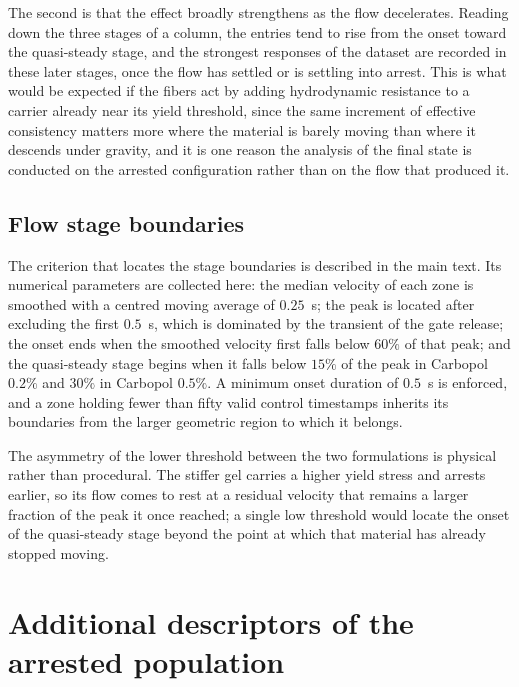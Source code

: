 \documentclass[%
  aip,
  pof,
  reprint,
  floatfix
]{revtex4-2}
\begin{document}
The second is that the effect broadly strengthens as the flow decelerates. Reading down the three stages of a column, the entries tend to rise from the onset toward the quasi-steady stage, and the strongest responses of the dataset are recorded in these later stages, once the flow has settled or is settling into arrest. This is what would be expected if the fibers act by adding hydrodynamic resistance to a carrier already near its yield threshold, since the same increment of effective consistency matters more where the material is barely moving than where it descends under gravity, and it is one reason the analysis of the final state is conducted on the arrested configuration rather than on the flow that produced it.

\subsection{Flow stage boundaries}

The criterion that locates the stage boundaries is described in the main text. Its numerical parameters are collected here: the median velocity of each zone is smoothed with a centred moving average of $0.25$~s; the peak is located after excluding the first $0.5$~s, which is dominated by the transient of the gate release; the onset ends when the smoothed velocity first falls below $60\%$ of that peak; and the quasi-steady stage begins when it falls below $15\%$ of the peak in Carbopol $0.2\%$ and $30\%$ in Carbopol $0.5\%$. A minimum onset duration of $0.5$~s is enforced, and a zone holding fewer than fifty valid control timestamps inherits its boundaries from the larger geometric region to which it belongs.

The asymmetry of the lower threshold between the two formulations is physical rather than procedural. The stiffer gel carries a higher yield stress and arrests earlier, so its flow comes to rest at a residual velocity that remains a larger fraction of the peak it once reached; a single low threshold would locate the onset of the quasi-steady stage beyond the point at which that material has already stopped moving.


\section{Additional descriptors of the arrested population}
\label{sup:finalstate}
\end{document}
